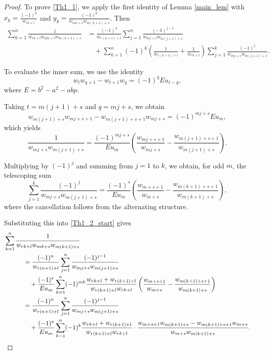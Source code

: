 \documentclass[12pt,reqno]{article}
\begin{document}
\begin{proof}
	To prove \eqref{Th1_1}, we apply the first identity of Lemma \ref{main_lem} with
	$x_k=\frac{(-1)^k}{w_{rk+l}}$
	{and}
	$y_k=\frac{(-1)^k}{w_{mk+s}w_{m(k+1)+s}}$.
	Then
		\begin{align}
		\sum_{k=1}^n \frac{1}{w_{rk+l}w_{mk+s}w_{m(k+1)+s}}
		&=
		\frac{(-1)^n}{w_{r(n+1)+l}}
		\sum_{j=1}^n
		\frac{(-1)^{j-1}}{w_{mj+s}w_{m(j+1)+s}}
		\nonumber\\
		&\quad+
		\sum_{k=1}^{n}(-1)^k
		\left(
		\frac{1}{w_{r(k+1)+l}}
		+\frac{1}{w_{rk+l}}
		\right)
		\sum_{j=1}^{k}
		\frac{(-1)^j}{w_{mj+s}w_{m(j+1)+s}}.
		\label{Th1_2_start}
		\end{align}
		
	To evaluate the inner sum, we use the identity \cite{Horadam1965}
		\begin{equation}
		w_t w_{q+1} - w_{t+1}w_q
		=
		(-1)^q E u_{t-q},
		\label{Horadam}
		\end{equation}
where $E=b^2-a^2-abp$.
	
	Taking $t=m(j+1)+s$ and $q=mj+s$, we obtain
	    \begin{equation*}
		w_{m(j+1)+s}w_{mj+s+1}
		-
		w_{m(j+1)+s+1}w_{mj+s}
		=
		(-1)^{mj+s}E u_m,
		\end{equation*}
	which yields
	\begin{equation*}
		\frac{1}{w_{mj+s}w_{m(j+1)+s}}
		=
		\frac{(-1)^{mj+s}}{E u_m}
		\left(
		\frac{w_{mj+s+1}}{w_{mj+s}}
		-
		\frac{w_{m(j+1)+s+1}}{w_{m(j+1)+s}}
		\right).
		\end{equation*}

	Multiplying by $(-1)^j$ and summing from $j=1$ to $k$, we obtain, for odd $m$, the telescoping sum
		\begin{equation*}
		\sum_{j=1}^k
		\frac{(-1)^j}{w_{mj+s}w_{m(j+1)+s}}
		=
		\frac{(-1)^s}{E u_m}
		\left(
		\frac{w_{m+s+1}}{w_{m+s}}
		-
		\frac{w_{m(k+1)+s+1}}{w_{m(k+1)+s}}
		\right),
		\end{equation*}
where the cancellation follows from the alternating structure.
	
Substituting this into \eqref{Th1_2_start} gives
		\begin{align*}
		&\sum_{k=1}^n
		\frac{1}{w_{rk+l}w_{mk+s}w_{m(k+1)+s}}
		\notag\\
		&\quad\qquad=
		\frac{(-1)^n}{w_{r(n+1)+l}}
		\sum_{j=1}^n
		\frac{(-1)^{j-1}}{w_{mj+s}w_{m(j+1)+s}}
		\notag\\
		&\qquad\qquad+
		\frac{(-1)^s}{E u_m}
		\sum_{k=1}^{n}
		(-1)^{mk}
		\frac{w_{rk+l}+w_{r(k+1)+l}}
		{w_{r(k+1)+l}w_{rk+l}}
		\left(
		\frac{w_{m+s+1}}{w_{m+s}}
		-
		\frac{w_{m(k+1)+s+1}}{w_{m(k+1)+s}}
		\right)
		\notag\\
		&\quad\qquad=
		\frac{(-1)^n}{w_{r(n+1)+l}}
		\sum_{j=1}^n
		\frac{(-1)^{j-1}}{w_{mj+s}w_{m(j+1)+s}}
		\notag\\
		&\qquad\qquad+
		\frac{(-1)^s}{E u_m}
		\sum_{k=1}^{n}
		(-1)^k
		\frac{w_{rk+l}+w_{r(k+1)+l}}
		{w_{r(k+1)+l}w_{rk+l}}
		\cdot
		\frac{
			w_{m+s+1}w_{m(k+1)+s}
			-
			w_{m(k+1)+s+1}w_{m+s}
		}
		{w_{m+s}w_{m(k+1)+s}}.
		\end{align*}
	

\end{proof}
\end{document}
